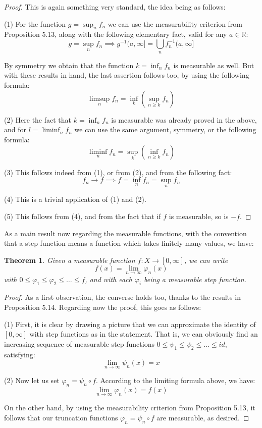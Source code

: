 \documentclass[12pt]{amsbook}
\newtheorem{theorem}{Theorem}[chapter]
\begin{document}
\begin{proof}
This is again something very standard, the idea being as follows:

\medskip

(1) For the function $g=\sup_nf_n$ we can use the measurability criterion from Proposition 5.13, along with the following elementary fact, valid for any $a\in\mathbb R$:
$$g=\sup_nf_n\implies g^{-1}(a,\infty]=\bigcup_nf_n^{-1}(a,\infty]$$

By symmetry we obtain that the function $k=\inf_nf_n$ is measurable as well. But with these results in hand, the last assertion follows too, by using the following formula:
$$\limsup_nf_n=\inf_k\left(\sup_{n\geq k}f_n\right)$$

(2) Here the fact that $k=\inf_nf_n$ is measurable was already proved in the above, and for $l=\liminf_nf_n$ we can use the same argument, symmetry, or the following formula:
$$\liminf_nf_n=\sup_k\left(\inf_{n\geq k}f_n\right)$$

(3) This follows indeed from (1), or from (2), and from the following fact:
$$f_n\to f\implies f=\inf_nf_n=\sup_nf_n$$

(4) This is a trivial application of (1) and (2).

\medskip

(5) This follows from (4), and from the fact that if $f$ is measurable, so is $-f$.
\end{proof}

As a main result now regarding the measurable functions, with the convention that a step function means a function which takes finitely many values, we have:

\begin{theorem}
Given a measurable function $f:X\to[0,\infty]$, we can write
$$f(x)=\lim_{n\to\infty}\varphi_n(x)$$
with $0\leq\varphi_1\leq\varphi_2\leq\ldots\leq f$, and with each $\varphi_i$ being a measurable step function.
\end{theorem}

\begin{proof}
As a first observation, the converse holds too, thanks to the results in Proposition 5.14. Regarding now the proof, this goes as follows:

\medskip

(1) First, it is clear by drawing a picture that we can approximate the identity of $[0,\infty]$ with step functions as in the statement. That is, we can obviously find an increasing sequence of measurable step functions $0\leq\psi_1\leq\psi_2\leq\ldots\leq id$, satisfying:
$$\lim_{n\to\infty}\psi_n(x)=x$$ 

(2) Now let us set $\varphi_n=\psi_n\circ f$. According to the limiting formula above, we have:
$$\lim_{n\to\infty}\varphi_n(x)=f(x)$$

On the other hand, by using the measurability criterion from Proposition 5.13, it follows that our truncation functions $\varphi_n=\psi_n\circ f$ are measurable, as desired.
\end{proof}
\end{document}
